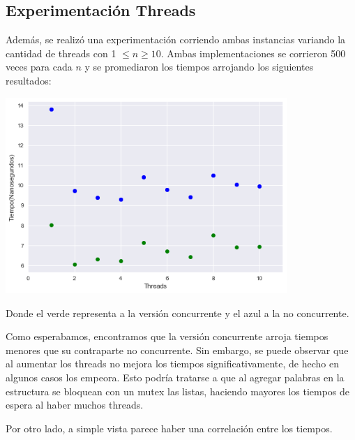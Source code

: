 \subsection{Experimentación Threads}

Además, se realizó una experimentación corriendo ambas instancias variando la cantidad de threads con 1 $\leq n \geq 10$.
Ambas implementaciones se corrieron 500 veces para cada $n$ y se promediaron los tiempos arrojando los siguientes resultados:

\begin{center}
\includegraphics[width=0.8\textwidth]{imagenes/threads.png}
\end{center}

Donde el verde representa a la versión concurrente y el azul a la no concurrente.

Como esperabamos, encontramos que la versión concurrente arroja tiempos menores que su contraparte no concurrente. Sin embargo, se puede observar que al aumentar los threads no mejora los tiempos significativamente, de hecho en algunos casos los empeora. Esto podría tratarse a que al agregar palabras en la estructura se bloquean con un mutex las listas, haciendo mayores los tiempos de espera al haber muchos threads.

Por otro lado, a simple vista parece haber una correlación entre los tiempos.


